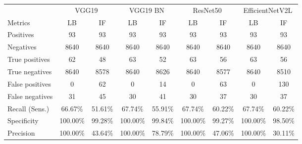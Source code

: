 \begin{table}[!ht]
    \centering
    \begin{tabular}{l | c c | c c | c c | c c}
                        & \multicolumn{2}{c|}{VGG19} & \multicolumn{2}{c|}{VGG19 BN} & \multicolumn{2}{c|}{ResNet50} & \multicolumn{2}{c}{EfficientNetV2L}                                           \\
        Metrics         & LB                         & IF                            & LB                            & IF                                  & LB       & IF      & LB       & IF      \\
        \hline
        Positives       & 93                         & 93                            & 93                            & 93                                  & 93       & 93      & 93       & 93      \\
        Negatives       & 8640                       & 8640                          & 8640                          & 8640                                & 8640     & 8640    & 8640     & 8640    \\
        True positives  & 62                         & 48                            & 63                            & 52                                  & 63       & 56      & 63       & 56      \\
        True negatives  & 8640                       & 8578                          & 8640                          & 8626                                & 8640     & 8577    & 8640     & 8510    \\
        False positives & 0                          & 62                            & 0                             & 14                                  & 0        & 63      & 0        & 130     \\
        False negatives & 31                         & 45                            & 30                            & 41                                  & 30       & 37      & 30       & 37      \\
        \hline
        Recall (Sens.)  & 66.67\%                    & 51.61\%                       & 67.74\%                       & 55.91\%                             & 67.74\%  & 60.22\% & 67.74\%  & 60.22\% \\
        Specificity     & 100.00\%                   & 99.28\%                       & 100.00\%                      & 99.84\%                             & 100.00\% & 99.27\% & 100.00\% & 98.50\% \\
        Precision       & 100.00\%                   & 43.64\%                       & 100.00\%                      & 78.79\%                             & 100.00\% & 47.06\% & 100.00\% & 30.11\% \\

\end{tabular}
\end{table}
